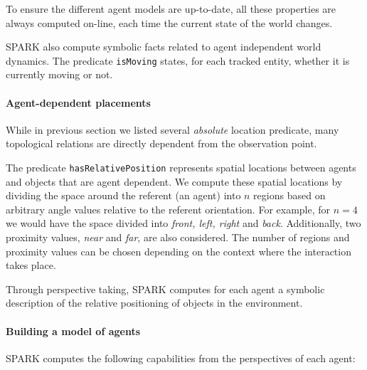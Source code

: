 \documentclass[a4paper]{article}
\begin{document}
To ensure the different agent models are up-to-date, all these properties are
always computed on-line, each time the current state of the world changes.

SPARK also compute symbolic facts related to agent independent world dynamics.
The predicate \texttt{isMoving} states, for each tracked entity, whether it is
currently moving or not.


\paragraph{Agent-dependent placements}

While in previous section we listed several \emph{absolute} location predicate,
many topological relations are directly dependent from the observation point.

The predicate \texttt{hasRelativePosition} represents spatial locations
between agents and objects that are agent dependent.  We compute these spatial
locations by dividing the space around the referent (an agent) into $n$ regions
based on arbitrary angle values relative to the referent orientation.  For
example, for $n = 4$ we would have the space divided into \emph{front, left,
right} and \emph{back}. Additionally, two proximity values, \emph{near} and
\emph{far}, are also considered. The number of regions and proximity values can
be chosen depending on the context where the interaction takes place.

Through perspective taking, SPARK computes for each agent a symbolic
description of the relative positioning of objects in the environment.

\paragraph{Building a model of agents}
\label{sect|grounding_agents}

SPARK computes the following capabilities from the perspectives of each agent:
\end{document}
